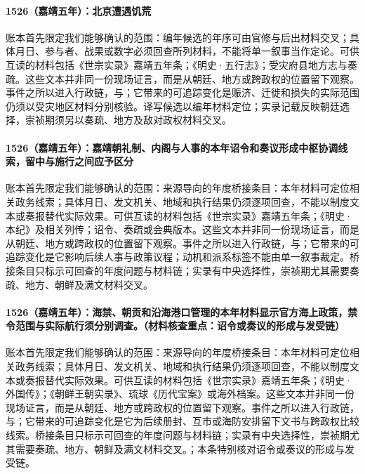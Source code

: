 \paragraph{1526（嘉靖五年）：北京遭遇饥荒} 账本首先限定我们能够确认的范围：编年候选的年序可由官修与后出材料交叉；具体月日、参与者、战果或数字必须回查所列材料，不能将单一叙事当作定论。可供互读的材料包括《世宗实录》嘉靖五年条；《明史·五行志》；受灾府县地方志与奏疏。这些文本并非同一份现场证言，而是从朝廷、地方或跨政权的位置留下观察。事件之所以进入行政链，与；它带来的可追踪变化是赈济、迁徙和损失的实际范围仍须以受灾地区材料分别核验。译写候选以编年材料定位；实录记载反映朝廷选择，崇祯期须另以奏疏、地方及敌对政权材料交叉。

\paragraph{1526（嘉靖五年）：嘉靖朝礼制、内阁与人事的本年诏令和奏议形成中枢协调线索，留中与施行之间应予区分} 账本首先限定我们能够确认的范围：来源导向的年度桥接条目：本年材料可定位相关政务线索；具体月日、发文机关、地域和执行结果仍须逐项回查，不能以制度文本或奏报替代实际效果。可供互读的材料包括《世宗实录》嘉靖五年条；《明史·本纪》及相关列传；诏令、奏疏或会典版本。这些文本并非同一份现场证言，而是从朝廷、地方或跨政权的位置留下观察。事件之所以进入行政链，与；它带来的可追踪变化是它影响后续人事与政策议程；动机和派系标签不能由单一叙事裁定。桥接条目只标示可回查的年度问题与材料链；实录有中央选择性，崇祯期尤其需要奏疏、地方、朝鲜及满文材料交叉。

\paragraph{1526（嘉靖五年）：海禁、朝贡和沿海港口管理的本年材料显示官方海上政策，禁令范围与实际航行须分别调查。（材料核查重点：诏令或奏议的形成与发受链）} 账本首先限定我们能够确认的范围：来源导向的年度桥接条目：本年材料可定位相关政务线索；具体月日、发文机关、地域和执行结果仍须逐项回查，不能以制度文本或奏报替代实际效果。可供互读的材料包括《世宗实录》嘉靖五年条；《明史·外国传》；《朝鲜王朝实录》、琉球《历代宝案》或海外档案。这些文本并非同一份现场证言，而是从朝廷、地方或跨政权的位置留下观察。事件之所以进入行政链，与；它带来的可追踪变化是它为后续册封、互市或海防安排留下文书与跨政权比较线索。桥接条目只标示可回查的年度问题与材料链；实录有中央选择性，崇祯期尤其需要奏疏、地方、朝鲜及满文材料交叉。；本条特别核对诏令或奏议的形成与发受链。

